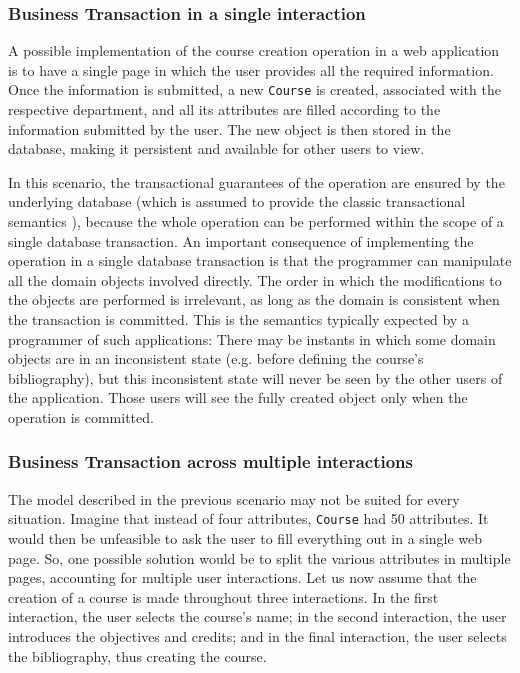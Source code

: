 \documentclass{llncs}
\begin{document}
\subsubsection{Business Transaction in a single interaction}

A possible implementation of the course creation operation in a web
application is to have a single page in which the user provides all
the required information. Once the information is submitted, a new
\texttt{Course} is created, associated with the respective department,
and all its attributes are filled according to the information
submitted by the user. The new object is then stored in the database,
making it persistent and available for other users to view.

In this scenario, the transactional guarantees of the operation are
ensured by the underlying database (which is assumed to provide the
classic transactional semantics \cite{gray1981transaction}), because
the whole operation can be performed within the scope of a single
database transaction. An important consequence of implementing the
operation in a single database transaction is that the programmer can
manipulate all the domain objects involved directly. The order in
which the modifications to the objects are performed is irrelevant, as
long as the domain is consistent when the transaction is
committed. This is the semantics typically expected by a programmer of
such applications: There may be instants in which some domain objects
are in an inconsistent state (e.g. before defining the course's
bibliography), but this inconsistent state will never be seen by the
other users of the application. Those users will see the fully created
object only when the operation is committed.

\subsubsection{Business Transaction across multiple interactions}

The model described in the previous scenario may not be suited for
every situation. Imagine that instead of four attributes,
\texttt{Course} had 50 attributes. It would then be unfeasible to ask
the user to fill everything out in a single web page. So, one possible
solution would be to split the various attributes in multiple pages,
accounting for multiple user interactions. Let us now assume that the
creation of a course is made throughout three interactions. In the
first interaction, the user selects the course's name; in the second
interaction, the user introduces the objectives and credits; and in
the final interaction, the user selects the bibliography, thus
creating the course.
\end{document}
